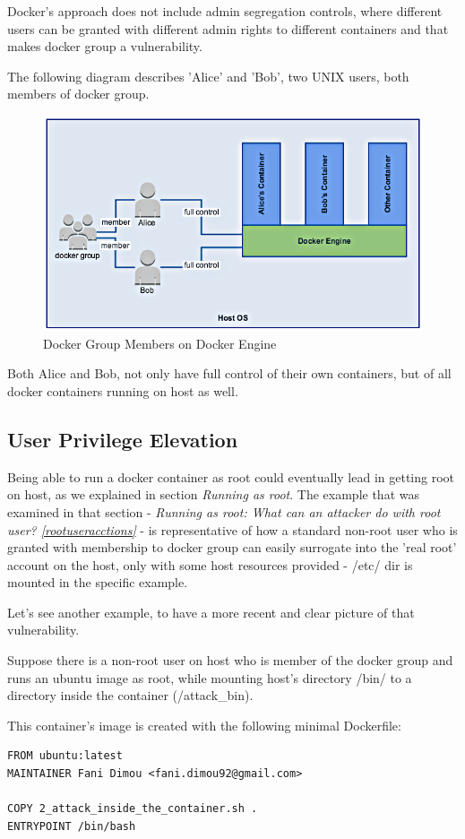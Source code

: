 Docker's approach does not include admin segregation controls, where different users can be granted with different admin rights to different containers and that makes docker group a vulnerability.

The following diagram describes 'Alice' and 'Bob', two UNIX users, both members of docker group.

\begin{figure}[h!]
  \centering
   \includegraphics[width=0.85\linewidth]{figures/dockergroupgm.png}
   \caption{Docker Group Members on Docker Engine}
\end{figure}

Both Alice and Bob, not only have full control of their own containers, but of all docker containers running on host as well.

\subsection{User Privilege Elevation}
Being able to run a docker container as root could eventually lead in getting root on host, as we explained in section \textit{Running as root}. The example that was examined in that section - \textit{Running as root: What can an attacker do with root user? \ref{rootuseracctions}} - is representative of how a standard non-root user who is granted with membership to docker group can easily surrogate into the 'real root' account on the host, only with some host resources provided - /etc/ dir is mounted in the specific example.

Let's see another example, to have a more recent and clear picture of that vulnerability.

Suppose there is a non-root user on host who is member of the docker group and runs an ubuntu image as root, while mounting host's directory /bin/ to a directory inside the container (/attack\_bin). 

This container's image is created with the following minimal Dockerfile:
\begin{lstlisting}[style=Dockerfile, caption={Dockerfile used for docgroup image}]
FROM ubuntu:latest
MAINTAINER Fani Dimou <fani.dimou92@gmail.com>

COPY 2_attack_inside_the_container.sh .
ENTRYPOINT /bin/bash
\end{lstlisting}

